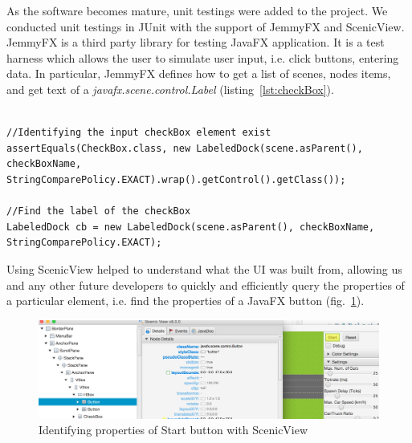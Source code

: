 As the software becomes mature, unit testings were added to the project. We conducted unit testings in JUnit with the support of JemmyFX and ScenicView. JemmyFX is a third party library for testing JavaFX application. It is a test harness which allows the user to simulate user input, i.e. click buttons, entering data. In particular, JemmyFX defines how to get a list of scenes, nodes items, and get text of a \textit{javafx.scene.control.Label} (listing~\ref{lst:checkBox}).


\begin{minipage}{0.9\textwidth}
	\begin{lstlisting}[caption={Use JemmyFX syntax to find a checkBox element}, label={lst:checkBox}]

//Identifying the input checkBox element exist
assertEquals(CheckBox.class, new LabeledDock(scene.asParent(), checkBoxName, StringComparePolicy.EXACT).wrap().getControl().getClass());

//Find the label of the checkBox 
LabeledDock cb = new LabeledDock(scene.asParent(), checkBoxName, StringComparePolicy.EXACT);

	\end{lstlisting}
\end{minipage}

Using ScenicView helped to understand what the UI was built from, allowing us and any other future developers to quickly and efficiently query the properties of a particular element, i.e. find the properties of a JavaFX button (fig.~\ref{fig:scenicview}). 

\begin{figure}[h]
	\begin{center}
		\includegraphics[width=\textwidth]{img/scenicView.png}
		\caption[Identifying properties of Start button with ScenicView]{Identifying properties of Start button with ScenicView}
		\label{fig:scenicview}
	\end{center}
\end{figure}

